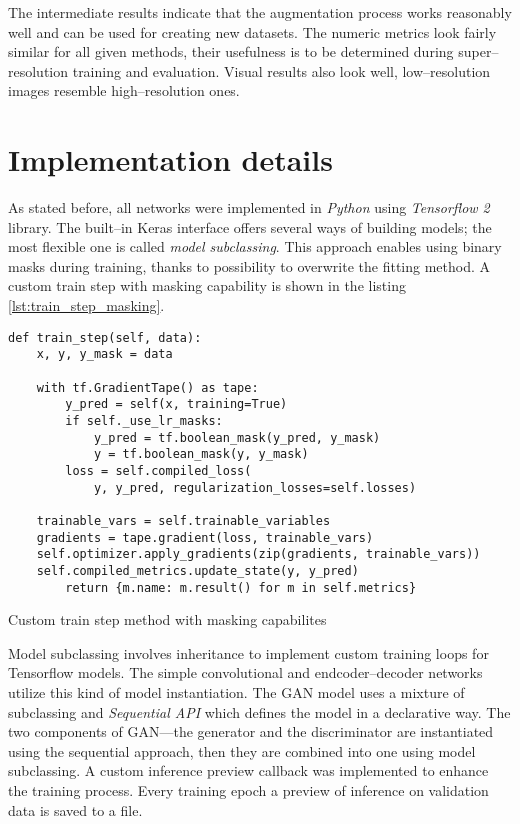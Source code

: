 The intermediate results indicate that the augmentation process works reasonably well and can be used for creating new datasets.
The numeric metrics look fairly similar for all given methods, their usefulness is to be determined during super--resolution training and evaluation.
Visual results also look well, low--resolution images resemble high--resolution ones.

\section{Implementation details}
As stated before, all networks were implemented in \textit{Python} using \textit{Tensorflow 2} library.
The built--in Keras interface offers several ways of building models; the most flexible one is called \textit{model subclassing}.
This approach enables using binary masks during training, thanks to possibility to overwrite the fitting method.
A custom train step with masking capability is shown in the listing \ref{lst:train_step_masking}.
\begin{listing}
\begin{verbatim}
def train_step(self, data):
    x, y, y_mask = data

    with tf.GradientTape() as tape:
        y_pred = self(x, training=True)
        if self._use_lr_masks:
            y_pred = tf.boolean_mask(y_pred, y_mask)
            y = tf.boolean_mask(y, y_mask)
        loss = self.compiled_loss(
            y, y_pred, regularization_losses=self.losses)

    trainable_vars = self.trainable_variables
    gradients = tape.gradient(loss, trainable_vars)
    self.optimizer.apply_gradients(zip(gradients, trainable_vars))
    self.compiled_metrics.update_state(y, y_pred)
        return {m.name: m.result() for m in self.metrics}
\end{verbatim}
\caption{Custom train step method with masking capabilites}
\label{lst:train_step_masking}
\end{listing}


Model subclassing involves inheritance to implement custom training loops for Tensorflow models.
The simple convolutional and endcoder--decoder networks utilize this kind of model instantiation.
The GAN model uses a mixture of subclassing and \textit{Sequential API} which defines the model in a declarative way.
The two components of GAN---the generator and the discriminator are instantiated using the sequential approach, then they are combined into one using model subclassing.
A custom inference preview callback was implemented to enhance the training process.
Every training epoch a preview of inference on validation data is saved to a file.

